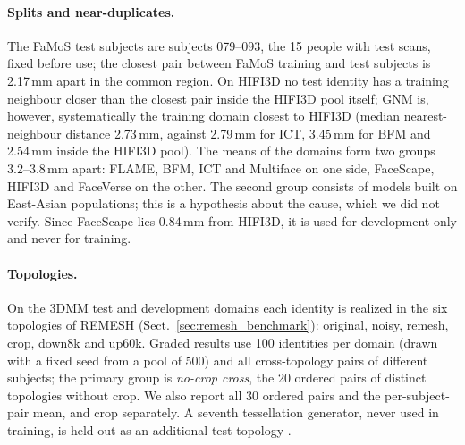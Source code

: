 \paragraph{Splits and near-duplicates.}
The FaMoS test subjects are subjects 079--093, the 15 people with test scans,
fixed before use; the closest pair between FaMoS training and test subjects is
2.17\,mm apart in the common region.
On HIFI3D no test identity has a training neighbour closer than the closest
pair inside the HIFI3D pool itself; GNM is, however, systematically the
training domain closest to HIFI3D (median nearest-neighbour distance 2.73\,mm,
against 2.79\,mm for ICT, 3.45\,mm for BFM and 2.54\,mm inside the HIFI3D pool).
The means of the domains form two groups 3.2--3.8\,mm apart: FLAME, BFM, ICT
and Multiface on one side, FaceScape, HIFI3D and FaceVerse on the other. The
second group consists of models built on East-Asian populations; this is a
hypothesis about the cause, which we did not verify.
Since FaceScape lies 0.84\,mm from HIFI3D, it is used for development only
and never for training.

\paragraph{Topologies.}
On the 3DMM test and development domains each identity is realized in the six
topologies of REMESH (Sect.~\ref{sec:remesh_benchmark}): original, noisy,
remesh, crop, down8k and up60k. Graded results use 100 identities per domain
(drawn with a fixed seed from a pool of 500) and all cross-topology pairs of
different subjects; the primary group is \emph{no-crop cross}, the 20 ordered
pairs of distinct topologies without crop. We also report all 30 ordered
pairs and the per-subject-pair mean, and crop separately.
A seventh tessellation generator, never used in training, is held out as an
additional test topology .

